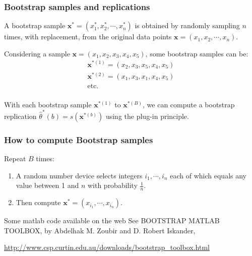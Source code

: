

\frame
{
\frametitle{Bootstrap samples and replications}

\begin{definition}
A \alert{bootstrap sample} $\mathbf{x}^{*}=(x^{*}_{1},x^{*}_{2},\cdots,x^{*}_{n})$ is obtained by randomly sampling $n$ times, with replacement, from the original data points $\mathbf{x}=(x_{1},x_{2},\cdots,x_{n})$.
\end{definition}

\begin{exampleblock}{}
Considering a sample $\mathbf{x}=(x_1,x_2,x_3,x_4,x_5)$, some bootstrap samples can be: 
$$
\begin{array}{l}
\mathbf{x}^{*(1)}=( x_{2},x_{3},x_{5},x_{4},x_{5})\\
\mathbf{x}^{*(2)}=( x_{1},x_{3},x_{1},x_{4},x_{5})\\
\mathrm{etc.}\\
\end{array}
$$
\end{exampleblock}
\begin{definition}
With each bootstrap sample $\mathbf{x}^{*(1)}$ to  $\mathbf{x}^{*(B)}$, we can compute a \alert{bootstrap replication} $\hat{\theta}^{*}(b)=s(\mathbf{x}^{*(b)})$ using the plug-in principle. 
\end{definition}

}
\frame
{
\frametitle{How to compute Bootstrap samples}

\begin{block}{}
Repeat $B$ times: 
\begin{enumerate}
\item A random number device selects integers $i_1,\cdots, i_n$ each of which equals any value between 1 and $n$ with probability $\frac{1}{n}$.
\item Then compute $\mathbf{x}^{*}=(x_{i_1},\cdots,x_{i_n})$.
\end{enumerate}
\end{block}

\begin{exampleblock}{Some matlab code available on the web}
See BOOTSTRAP MATLAB TOOLBOX, by Abdelhak M. Zoubir and D. Robert Iskander, 
 
\href{http://www.csp.curtin.edu.au/downloads/bootstrap_toolbox.html}{http://www.csp.curtin.edu.au/downloads/bootstrap\_toolbox.html}
\end{exampleblock}


}
